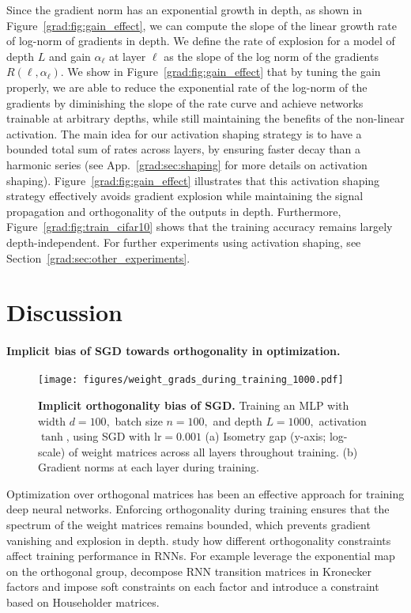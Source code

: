 Since the gradient norm has an exponential growth in depth, as shown in Figure~\ref{grad:fig:gain_effect}, we can compute the slope of the linear growth rate of log-norm of gradients in depth. We define the rate of explosion for a model of depth $L$ and gain $\alpha_\ell$ at layer $\ell$ as the slope of the log norm of the gradients $R(\ell, \alpha_\ell)$. We show in Figure~\ref{grad:fig:gain_effect} that by tuning the gain properly, we are able to reduce the exponential rate of the log-norm of the gradients by diminishing the slope of the rate curve and achieve networks trainable at arbitrary depths, while still maintaining the benefits of the non-linear activation. The main idea for our activation shaping strategy is to have a bounded total sum of rates across layers, by ensuring faster decay than a harmonic series (see App.~\ref{grad:sec:shaping} for more details on activation shaping). Figure~\ref{grad:fig:gain_effect} illustrates that this activation shaping strategy effectively avoids gradient explosion while maintaining the signal propagation and orthogonality of the outputs in depth. Furthermore, Figure~\ref{grad:fig:train_cifar10} shows that the training accuracy remains largely depth-independent. For further experiments using activation shaping, see Section~\ref{grad:sec:other_experiments}.



\section{Discussion}


\paragraph{Implicit bias of SGD towards orthogonality in optimization.} 
\begin{figure}[ht]
    \centering
    \texttt{[image: figures/weight\_grads\_during\_training\_1000.pdf]}
    \vspace{-.5cm}
    \caption{\textbf{Implicit orthogonality bias of SGD.} Training an MLP with width $d=100,$ batch size $n=100,$ and depth $L=1000,$ activation $\tanh$, using SGD with $\text{lr}=0.001$ (a) Isometry gap (y-axis; log-scale) of weight matrices across all layers throughout training. (b) Gradient norms at each layer during training. }
    \label{grad:fig:ortho_during_training_1000}    
\end{figure}
Optimization over orthogonal matrices has been an effective approach for training deep neural networks. Enforcing orthogonality during training ensures that the spectrum of the weight matrices remains bounded, which prevents gradient vanishing and explosion in depth. \citet{vorontsov2017orthogonality} study how different orthogonality constraints affect training performance in RNNs. For example \citet{lezcano2019cheap} leverage the exponential map on the orthogonal group, \citet{jose2018kronecker} decompose RNN transition matrices in Kronecker factors and impose soft constraints on each factor and \citet{mhammedi2017efficient} introduce a constraint based on Householder matrices.


